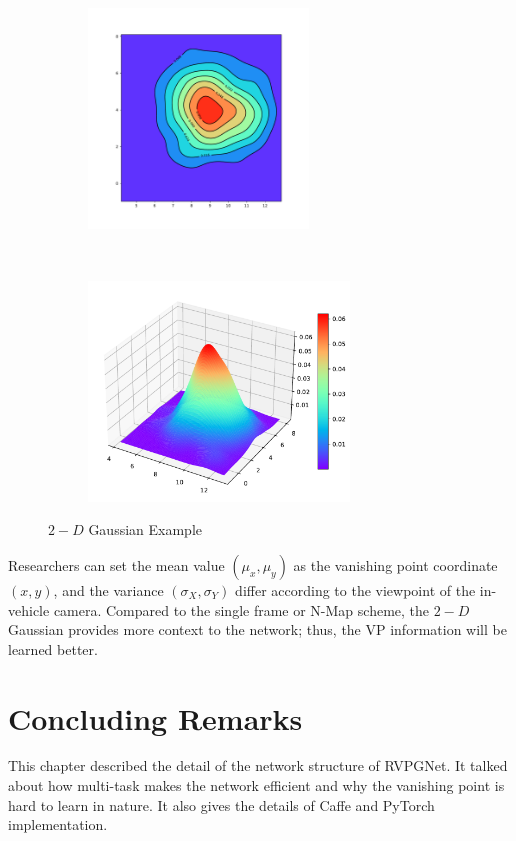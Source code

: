 \begin{spacing}{1.5}
\begin{figure}[!ht]
\begin{adjustbox}{minipage=0.98\linewidth,fbox}
    \centering
    \begin{subfigure}[b]{0.49\textwidth}
        \centering
        \includegraphics[height=2.3in]{Chapter3/gaussian2d.pdf}
    \end{subfigure}%
    ~
    \begin{subfigure}[b]{0.49\textwidth}
        \centering
        \includegraphics[height=2.3in]{Chapter3/gaussian3d.pdf}
    \end{subfigure}
\end{adjustbox}
\caption{$2-D$ Gaussian Example}
\label{fig:2dgaussian}
\end{figure}

Researchers can set the mean value $(\mu_x,\mu_y)$ as the vanishing point coordinate $(x,y)$, and the variance $(\sigma_X,\sigma_Y)$ differ according to the viewpoint of the in-vehicle camera. Compared to the single frame or N-Map scheme, the $2-D$ Gaussian provides more context to the network; thus, the VP information will be learned better.

\section{Concluding Remarks}

This chapter described the detail of the network structure of RVPGNet. It talked about how multi-task makes the network efficient and why the vanishing point is hard to learn in nature. It also gives the details of Caffe and PyTorch implementation.


\end{spacing}

